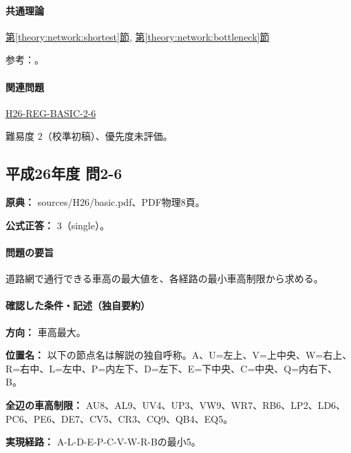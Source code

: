 \paragraph{共通理論} \hyperref[theory:network:shortest]{第\ref*{theory:network:shortest}節}, \hyperref[theory:network:bottleneck]{第\ref*{theory:network:bottleneck}節}

\par 参考：\cite{net_dijkstra}。

\paragraph{関連問題} \hyperref[q:h26-reg-basic-2-6]{H26-REG-BASIC-2-6}

\par 難易度 2（校準初稿）、優先度未評価。

\subsection{平成26年度 問2-6}
\label{q:h26-reg-basic-2-6}

\noindent\textbf{原典：} sources/H26/basic.pdf、PDF物理8頁。

\textbf{公式正答：} 3（single）。

\paragraph{問題の要旨} 道路網で通行できる車高の最大値を、各経路の最小車高制限から求める。

\paragraph{確認した条件・記述（独自要約）}\mbox{}\par

\noindent\textbf{方向：} 車高最大。\par

\noindent\textbf{位置名：} 以下の節点名は解説の独自呼称。A、U=左上、V=上中央、W=右上、R=右中、L=左中、P=内左下、D=左下、E=下中央、C=中央、Q=内右下、B。\par

\noindent\textbf{全辺の車高制限：} AU8、AL9、UV4、UP3、VW9、WR7、RB6、LP2、LD6、PC6、PE6、DE7、CV5、CR3、CQ9、QB4、EQ5。\par

\noindent\textbf{実現経路：} A-L-D-E-P-C-V-W-R-Bの最小5。\par

